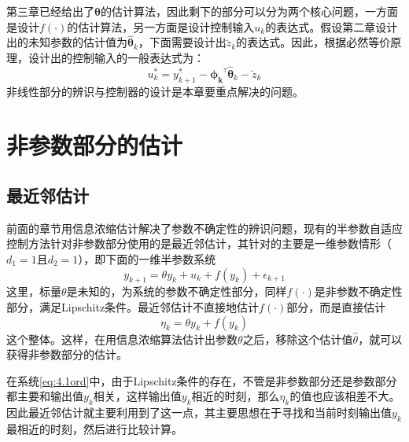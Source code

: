 第三章已经给出了$\bm{\theta}$的估计算法，因此剩下的部分可以分为两个核心问题，一方面是设计$f(\cdot)$的估计算法，另一方面是设计控制输入$u_{k}$的表达式。假设第二章设计出的未知参数的估计值为$\hat{\bm{\theta}}_{k}$，下面需要设计出$\breve{z}_{k}$的表达式。因此，根据必然等价原理，设计出的控制输入的一般表达式为：
\begin{equation}\label{eq:4.uk}
u_{k}^{*}=y_{k+1}^{*}-\bm{\phi_{k}}^{\tau}\hat{\bm{\theta}}_{k}-\breve{z}_{k}
\end{equation}
非线性部分的辨识与控制器的设计是本章要重点解决的问题。

\section{非参数部分的估计}\label{sect:4.2}
\subsection{最近邻估计}
前面的章节用信息浓缩估计解决了参数不确定性的辨识问题，现有的半参数自适应控制方法针对非参数部分使用的是最近邻估计，其针对的主要是一维参数情形（$d_{1}=1$且$d_{2}=1$），即下面的一维半参数系统
\begin{equation}%
\label{eq:4.1ord}
y_{k+1}=\theta y_{k}+u_{k}+f(y_{k})+\epsilon_{k+1}
\end{equation}
这里，标量$\theta$是未知的，为系统的参数不确定性部分，同样$f(\cdot)$是非参数不确定性部分，满足Lipschitz条件。最近邻估计不直接地估计$f(\cdot)$部分，而是直接估计
\begin{equation}\label{eq:4.nne.g}
\eta_{k} = \theta y_{k}+f(y_{k})
\end{equation}
这个整体。这样，在用信息浓缩算法估计出参数$\theta$之后，移除这个估计值$\hat{\theta}$，就可以获得非参数部分的估计。

在系统\eqref{eq:4.1ord}中，由于Lipschitz条件的存在，不管是非参数部分还是参数部分都主要和输出值$y_{k}$相关，这样输出值$y_{k}$相近的时刻，那么$\eta_{k}$的值也应该相差不大。因此最近邻估计就主要利用到了这一点，其主要思想在于寻找和当前时刻输出值$y_{k}$最相近的时刻，然后进行比较计算。

